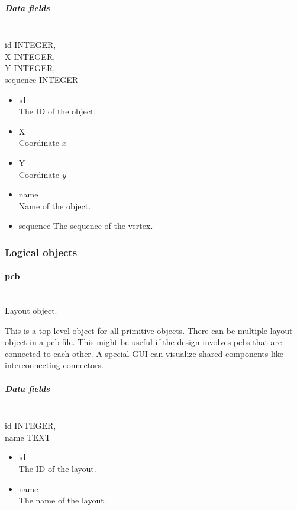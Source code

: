 \documentclass[12pt]{article}
\begin{document}
\subparagraph{Data fields}\label{data-fields-6}

\mbox{}\\

id INTEGER,\\
X INTEGER,\\
Y INTEGER,\\
sequence INTEGER

\begin{itemize}
\item
  id\\The ID of the object.
\item
  X\\Coordinate \emph{x}
\item
  Y\\Coordinate \emph{y}
\item
  name\\Name of the object.
\item
  sequence The sequence of the vertex.
\end{itemize}

\subsubsection{Logical objects}\label{logical-objects}

\paragraph{pcb}\label{pcb}

\mbox{}\\

Layout object.

This is a top level object for all primitive objects. There can be multiple
layout object in a pcb file. This might be useful if the design involves pcbs
that are connected to each other. A special GUI can visualize shared
components like interconnecting connectors.

\subparagraph{Data fields}\label{data-fields-7}

\mbox{}\\

id INTEGER,\\name TEXT

\begin{itemize}
\item
  id\\
The ID of the layout.
\item
  name\\
The name of the layout.
\end{itemize}
\end{document}
